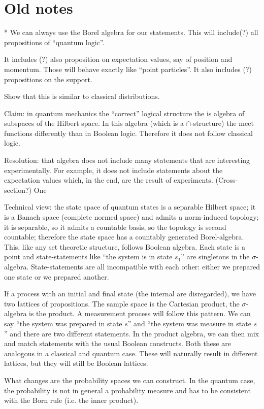 \documentclass[10pt,twocolumn, nofootinbib]{revtex4-1}
\begin{document}
\section{Old notes}

* We can always use the Borel algebra for our statements. This will include(?) all propositions of ``quantum logic''.

It includes (?) also proposition on expectation values, say of position and momentum. Those will behave exactly like ``point particles''. It also includes (?) propositions on the support.

Show that this is similar to classical distributions.


Claim: in quantum mechanics the ``correct'' logical structure the is algebra of subspaces of the Hilbert space. In this algebra (which is a $\cap$-structure) the meet functions differently than in Boolean logic. Therefore it does not follow classical logic.

Resolution: that algebra does not include many statements that are interesting experimentally. For example, it does not include statements about the expectation values which, in the end, are the result of experiments. (Cross-section?) One 


Technical view: the state space of quantum states is a separable Hilbert space; it is a Banach space (complete normed space) and admits a norm-induced topology; it is separable, so it admits a countable basis, so the topology is second countable; therefore the state space has a countably generated Borel-algebra. This, like any set theoretic structure, follows Boolean algebra. Each state is a point and state-statements like ``the system is in state $s_1$'' are singletons in the $\sigma$-algebra. State-statements are all incompatible with each other: either we prepared one state or we prepared another.

If a process with an initial and final state (the internal are disregarded), we have two lattices of propositions. The sample space is the Cartesian product, the $\sigma$-algebra is the product. A measurement process will follow this pattern. We can say ``the system was prepared in state $s$'' and ``the system was measure in state $s$'' and there are two different statements. In the product algebra, we can then mix and match statements with the usual Boolean constructs. Both these are analogous in a classical and quantum case. These will naturally result in different lattices, but they will still be Boolean lattices.

What changes are the probability spaces we can construct. In the quantum case, the probability is not in general a probability measure and has to be consistent with the Born rule (i.e. the inner product).



\end{document}
